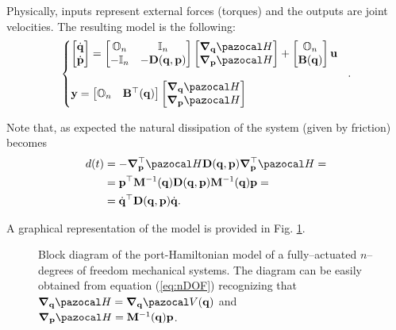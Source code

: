 \begin{exmp}
	Physically, inputs represent external forces (torques) and the outputs are joint velocities. The resulting model is the following:
	\begin{equation}\label{eq:nDOF}
	    \left\{
	        \begin{matrix*}[l]
	        \begin{bmatrix}	\dot{\q}\\\dot{\p}\end{bmatrix} 
        	=
	        \begin{bmatrix}\mathbb{O}_n&\mathbb{I}_n\\-\mathbb{I}_n&-\mathbf{D}(\q,\p)\end{bmatrix}
	        \begin{bmatrix}\bm{\nabla}_{\q}\Ha\\\bm{\nabla}_{\p}\Ha\end{bmatrix}
	        +
	        \begin{bmatrix}\mathbb{O}_n\\\mathbf{B}(\q)\end{bmatrix}\ub\\\\
	        \yb = \begin{bmatrix}\mathbb{O}_n&\mathbf{B}^\top(\q)\end{bmatrix}\begin{bmatrix}\bm{\nabla}_{\q}\Ha\\\bm{\nabla}_{\p}\Ha\end{bmatrix}
	    \end{matrix*}
	    \right.~~.
	\end{equation}
	
	Note that, as expected the natural dissipation of the system (given by friction) becomes
	\begin{align}
	    d(t) &= -\bm{\nabla}_\p^\top\Ha\mathbf{D}(\q,\p)\bm{\nabla}_\p^\top\Ha =\\ &=\p^\top\mathbf{M}^{-1}(\q)\mathbf{D}(\q,\p)\mathbf{M}^{-1}(\q)\p =\\
	    &= \dot{\q}^\top\mathbf{D}(\q,\p)\dot{\q}.
	\end{align}
	
	A graphical representation of the model is provided in Fig. \ref{fig:MECHscheme}.
	\begin{figure}[!ht]
	    \centering
	    
	    \caption[Block diagram of the port-Hamiltonian model of a fully--actuated $n$--degrees of freedom mechanical systems.]{Block diagram of the port-Hamiltonian model of a fully--actuated $n$--degrees of freedom mechanical systems. The diagram can be easily obtained from equation (\ref{eq:nDOF}) recognizing that $\bm{\nabla}_\q\Ha = \bm{\nabla}_\q\V(\q)$ and $\bm{\nabla}_\p\Ha = \mathbf{M}^{-1}(\q)\p$.}
	    \label{fig:MECHscheme}
	\end{figure}
\end{exmp}
